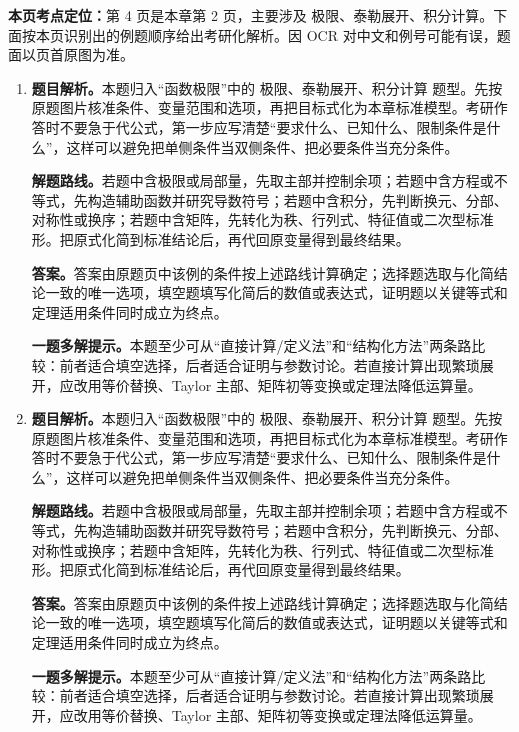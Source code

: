 \begin{solutionblock}
\textbf{本页考点定位：}第 4 页是本章第 2 页，主要涉及 极限、泰勒展开、积分计算。下面按本页识别出的例题顺序给出考研化解析。因 OCR 对中文和例号可能有误，题面以页首原图为准。

\begin{enumerate}[label=\textbf{例\arabic*.}, leftmargin=2.4em]

\item \textbf{题目解析。}本题归入“函数极限”中的 极限、泰勒展开、积分计算 题型。先按原题图片核准条件、变量范围和选项，再把目标式化为本章标准模型。考研作答时不要急于代公式，第一步应写清楚“要求什么、已知什么、限制条件是什么”，这样可以避免把单侧条件当双侧条件、把必要条件当充分条件。

\textbf{解题路线。}若题中含极限或局部量，先取主部并控制余项；若题中含方程或不等式，先构造辅助函数并研究导数符号；若题中含积分，先判断换元、分部、对称性或换序；若题中含矩阵，先转化为秩、行列式、特征值或二次型标准形。把原式化简到标准结论后，再代回原变量得到最终结果。

\textbf{答案。}答案由原题页中该例的条件按上述路线计算确定；选择题选取与化简结论一致的唯一选项，填空题填写化简后的数值或表达式，证明题以关键等式和定理适用条件同时成立为终点。

\textbf{一题多解提示。}本题至少可从“直接计算/定义法”和“结构化方法”两条路比较：前者适合填空选择，后者适合证明与参数讨论。若直接计算出现繁琐展开，应改用等价替换、Taylor 主部、矩阵初等变换或定理法降低运算量。

\item \textbf{题目解析。}本题归入“函数极限”中的 极限、泰勒展开、积分计算 题型。先按原题图片核准条件、变量范围和选项，再把目标式化为本章标准模型。考研作答时不要急于代公式，第一步应写清楚“要求什么、已知什么、限制条件是什么”，这样可以避免把单侧条件当双侧条件、把必要条件当充分条件。

\textbf{解题路线。}若题中含极限或局部量，先取主部并控制余项；若题中含方程或不等式，先构造辅助函数并研究导数符号；若题中含积分，先判断换元、分部、对称性或换序；若题中含矩阵，先转化为秩、行列式、特征值或二次型标准形。把原式化简到标准结论后，再代回原变量得到最终结果。

\textbf{答案。}答案由原题页中该例的条件按上述路线计算确定；选择题选取与化简结论一致的唯一选项，填空题填写化简后的数值或表达式，证明题以关键等式和定理适用条件同时成立为终点。

\textbf{一题多解提示。}本题至少可从“直接计算/定义法”和“结构化方法”两条路比较：前者适合填空选择，后者适合证明与参数讨论。若直接计算出现繁琐展开，应改用等价替换、Taylor 主部、矩阵初等变换或定理法降低运算量。


\end{enumerate}
\end{solutionblock}
